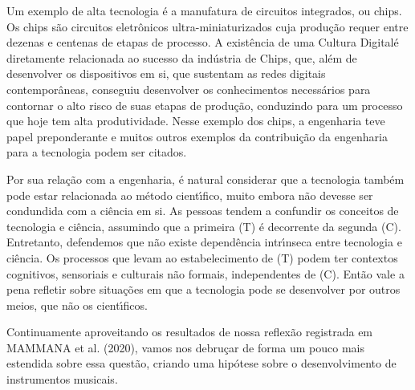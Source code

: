 \documentclass[
12pt,		%
openright,	%
twoside,  %
a4paper,			%
chapter=TITLE,		%
english,			%
french,				%
spanish,			%
brazil				%
]{USPSC-classe/USPSC}
\begin{document}
Um exemplo de alta tecnologia \'e a manufatura de circuitos integrados, ou chips. Os chips s\~ao circuitos eletr\^onicos ultra-miniaturizados cuja produ\c{c}\~ao requer entre dezenas e centenas de etapas de processo. A exist\^encia de uma \textquotedbl Cultura Digital\textquotedbl  \'e diretamente relacionada ao sucesso da ind\'ustria de Chips, que, al\'em de desenvolver os dispositivos em si, que sustentam as redes digitais contempor\^aneas, conseguiu desenvolver os conhecimentos necess\'arios para contornar o alto risco de suas etapas de produ\c{c}\~ao, conduzindo para um processo que hoje tem alta produtividade. Nesse exemplo dos chips, a engenharia teve papel preponderante e muitos outros exemplos da contribui\c{c}\~ao da engenharia para a tecnologia podem ser citados.









Por sua rela\c{c}\~ao com a engenharia, \'e natural considerar que a tecnologia tamb\'em pode estar relacionada ao m\'etodo cient\'{\i}fico, muito embora n\~ao devesse ser condundida com a ci\^encia em si. As pessoas tendem a confundir os conceitos de tecnologia e ci\^encia, assumindo que a primeira (T) \'e decorrente da segunda (C). Entretanto, defendemos que n\~ao existe depend\^encia intr\'{\i}nseca entre tecnologia e ci\^encia. Os processos que levam ao estabelecimento de (T) podem ter contextos cognitivos, sensoriais e culturais n\~ao formais, independentes de (C). Ent\~ao vale a pena refletir sobre situa\c{c}\~oes em que a tecnologia pode se desenvolver por outros meios, que n\~ao os cient\'{\i}ficos.









Continuamente aproveitando os resultados de nossa reflex\~ao registrada em  MAMMANA et al. (2020), vamos nos debru\c{c}ar de forma um pouco mais estendida sobre essa quest\~ao, criando uma hip\'otese sobre o desenvolvimento de instrumentos musicais.
\end{document}
